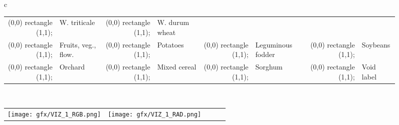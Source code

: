 \begin{figure}[th!]
\begin{tabular}{c}
\begin{tabular}{rlrlrlrl}
           \tikz \fill[fill=tempcolor, scale=0.3, draw=black] (0,0) rectangle (1,1); 
           & \footnotesize{W. triticale}
           &
           \definecolor{tempcolor}{rgb}{0.7686274509803922, 0.611764705882353, 0.5803921568627451}
           \tikz \fill[fill=tempcolor, scale=0.3, draw=black] (0,0) rectangle (1,1);
           & \footnotesize{W. durum wheat}
           \\
           \definecolor{tempcolor}{rgb}{0.8901960784313725, 0.4666666666666667, 0.7607843137254902}
           \tikz \fill[fill=tempcolor, scale=0.3, draw=black] (0,0) rectangle (1,1);
           & \footnotesize{Fruits, veg., flow.} 
           &
           \definecolor{tempcolor}{rgb}{0.9686274509803922, 0.7137254901960784, 0.8235294117647058}
           \tikz \fill[fill=tempcolor, scale=0.3, draw=black] (0,0) rectangle (1,1); 
           & \footnotesize{Potatoes}
           &
           \definecolor{tempcolor}{rgb}{0.4980392156862745, 0.4980392156862745, 0.4980392156862745}
           \tikz \fill[fill=tempcolor, scale=0.3, draw=black] (0,0) rectangle (1,1); 
           & \footnotesize{Leguminous fodder}
           &
           \definecolor{tempcolor}{rgb}{0.7803921568627451, 0.7803921568627451, 0.7803921568627451}
           \tikz \fill[fill=tempcolor, scale=0.3, draw=black] (0,0) rectangle (1,1);
           & \footnotesize{Soybeans}
           \\
           \definecolor{tempcolor}{rgb}{0.7372549019607844, 0.7411764705882353, 0.13333333333333333}
           \tikz \fill[fill=tempcolor, scale=0.3, draw=black] (0,0) rectangle (1,1);
           & \footnotesize{Orchard} 
           &
           \definecolor{tempcolor}{rgb}{0.8588235294117647, 0.8588235294117647, 0.5529411764705883}
           \tikz \fill[fill=tempcolor, scale=0.3, draw=black] (0,0) rectangle (1,1); 
           & \footnotesize{Mixed cereal}
           &
           \definecolor{tempcolor}{rgb}{0.09019607843137255, 0.7450980392156863, 0.81176470588235291}
           \tikz \fill[fill=tempcolor, scale=0.3, draw=black] (0,0) rectangle (1,1); 
           & \footnotesize{Sorghum}
           &
           \definecolor{tempcolor}{rgb}{1,1,1}
           \tikz \fill[fill=tempcolor, scale=0.3, draw=black] (0,0) rectangle (1,1);
           & \footnotesize{Void label}
    \end{tabular}
 \\
\begin{tabular}{ccccc}
    \texttt{[image: gfx/VIZ\_1\_RGB.png]}
     &
    \texttt{[image: gfx/VIZ\_1\_RAD.png]}

\end{tabular}
\end{tabular}
\end{figure}
